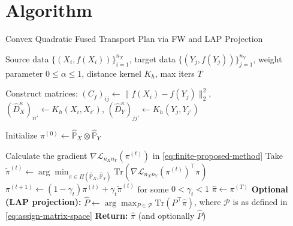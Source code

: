 \documentclass{article}
\begin{document}
\section{Algorithm}
\begin{algorithm}[t]
	\caption{Convex Quadratic Fused Transport Plan via FW and LAP Projection}
	\label{alg:proposed-algorithm}
	\begin{algorithmic}[1]
		\Require Source data $\{(X_i, f(X_i))\}_{i=1}^{n_X}$, target data $\{(Y_j, f(Y_j))\}_{j=1}^{n_Y}$, weight parameter $0 \leq \alpha \leq 1$, distance kernel $K_h$, max iters $T$
		
		\State Construct matrices:
		\Statex \hspace{\algorithmicindent} $(C_f)_{ij} \gets \|f(X_i)-f(Y_j)\|_2^2$, \quad
		$(\hat D_X^{\kappa})_{ii'} \gets K_h(X_i,X_{i'})$, \quad
		$(\hat D_Y^{\kappa})_{jj'} \gets K_h(Y_j,Y_{j'})$
		
		\State Initialize $\pi^{(0)} \gets \hat{\mathbb{P}}_X \otimes \hat{\mathbb{P}}_Y$
		
		\State Calculate the gradient $\nabla \mathcal{L}_{n_Xn_Y}(\pi^{(t)})$ in \eqref{eq:finite-proposed-method}
		\State Take $\tilde{\pi}^{(t)} \gets \arg\min_{\pi \in \Pi(\hat{\mathbb{P}}_X,\hat{\mathbb{P}}_Y)} \mathrm{Tr}(\nabla \mathcal{L}_{n_Xn_Y}(\pi^{(t)})^\top \pi)$
		\State $\pi^{(t+1)} \gets (1-\gamma_t)\pi^{(t)} + \gamma_t \tilde{\pi}^{(t)}$ for some $0 < \gamma_t < 1$
		\EndFor
		\State $\hat\pi \gets \pi^{(T)}$
		\State \textbf{Optional (LAP projection):} $\displaystyle
		\hat P \gets \arg\max_{P \in \mathcal{P}} \mathrm{Tr}(P^\top \hat\pi)$, where $\mathcal{P}$ is as defined in \eqref{eq:assign-matrix-space}
		\State \textbf{Return:} $\hat\pi$ (and optionally $\hat P$)
	\end{algorithmic}
\end{algorithm}
\end{document}
